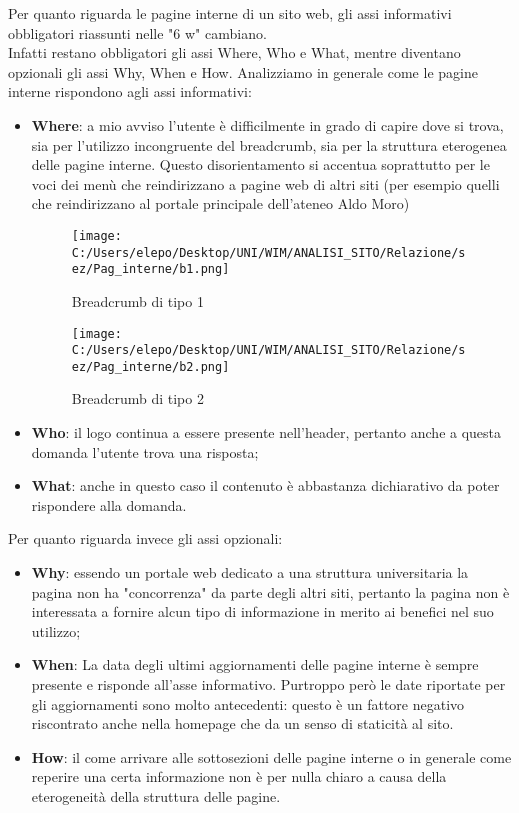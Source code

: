 Per quanto riguarda le pagine interne di un sito web, gli assi informativi obbligatori riassunti nelle "6 w" cambiano.\\
Infatti restano obbligatori gli assi Where, Who e What, mentre diventano opzionali gli assi Why, When e How. Analizziamo in generale come le pagine interne rispondono agli assi informativi:
	\begin{itemize}
		\item \textbf{Where}: a mio avviso l'utente è difficilmente in grado di capire dove si trova, sia per l'utilizzo incongruente del breadcrumb, sia per la struttura eterogenea delle pagine interne. Questo disorientamento si accentua soprattutto per le voci dei menù che reindirizzano a pagine web di altri siti (per esempio quelli che reindirizzano al portale principale dell'ateneo Aldo Moro)\begin{center}
\begin{figure}[h!]
           \begin{center}
           \texttt{[image: C:/Users/elepo/Desktop/UNI/WIM/ANALISI\_SITO/Relazione/sez/Pag\_interne/b1.png]}
           \caption{Breadcrumb di tipo 1}
           \end{center}
  \end{figure}
\end{center}

\begin{center}
\begin{figure}[h!]
           \begin{center}
           \texttt{[image: C:/Users/elepo/Desktop/UNI/WIM/ANALISI\_SITO/Relazione/sez/Pag\_interne/b2.png]}
           \caption{Breadcrumb di tipo 2}
           \end{center}
  \end{figure}
\end{center}
		\item \textbf{Who}: il logo continua a essere presente nell'header, pertanto anche a questa domanda l'utente trova una risposta;
		\item \textbf{What}: anche in questo caso il contenuto è abbastanza dichiarativo da poter rispondere alla domanda.
	\end{itemize}

Per quanto riguarda invece gli assi opzionali:
	\begin{itemize}
		\item \textbf{Why}: essendo un portale web dedicato a una struttura universitaria la pagina non ha "concorrenza" da parte degli altri siti, pertanto la pagina non è interessata a fornire alcun tipo di informazione in merito ai benefici nel suo utilizzo;
		\item \textbf{When}: La data degli ultimi aggiornamenti delle pagine interne è sempre presente e risponde all'asse informativo. Purtroppo però le date riportate per gli aggiornamenti sono molto antecedenti: questo è un fattore negativo riscontrato anche nella homepage che da un senso di staticità al sito.
		\item \textbf{How}: il come arrivare alle sottosezioni delle pagine interne o in generale come reperire una certa informazione non è per nulla chiaro a causa della eterogeneità della struttura delle pagine.
	\end{itemize}